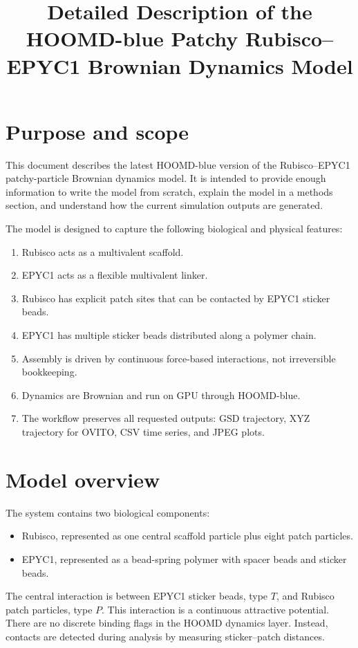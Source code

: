 \documentclass[11pt]{article}
\title{Detailed Description of the HOOMD-blue Patchy Rubisco--EPYC1 Brownian Dynamics Model}
\author{}
\date{}
\begin{document}
\maketitle
\tableofcontents
\newpage

\section{Purpose and scope}

This document describes the latest HOOMD-blue version of the Rubisco--EPYC1 patchy-particle Brownian dynamics model. It is intended to provide enough information to write the model from scratch, explain the model in a methods section, and understand how the current simulation outputs are generated.

The model is designed to capture the following biological and physical features:
\begin{enumerate}[label=\arabic*.]
    \item Rubisco acts as a multivalent scaffold.
    \item EPYC1 acts as a flexible multivalent linker.
    \item Rubisco has explicit patch sites that can be contacted by EPYC1 sticker beads.
    \item EPYC1 has multiple sticker beads distributed along a polymer chain.
    \item Assembly is driven by continuous force-based interactions, not irreversible bookkeeping.
    \item Dynamics are Brownian and run on GPU through HOOMD-blue.
    \item The workflow preserves all requested outputs: GSD trajectory, XYZ trajectory for OVITO, CSV time series, and JPEG plots.
\end{enumerate}

\section{Model overview}

The system contains two biological components:
\begin{itemize}
    \item Rubisco, represented as one central scaffold particle plus eight patch particles.
    \item EPYC1, represented as a bead-spring polymer with spacer beads and sticker beads.
\end{itemize}

The central interaction is between EPYC1 sticker beads, type \(T\), and Rubisco patch particles, type \(P\). This interaction is a continuous attractive potential. There are no discrete binding flags in the HOOMD dynamics layer. Instead, contacts are detected during analysis by measuring sticker--patch distances.
\end{document}
